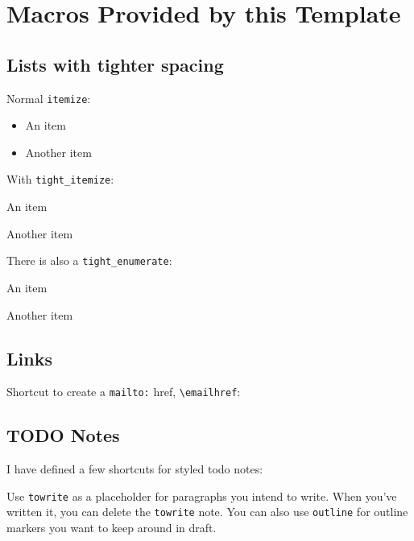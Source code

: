 \section{Macros Provided by this Template}

\subsection{Lists with tighter spacing}

Normal \lstinline{itemize}:

\begin{itemize}
    \item An item
    \item Another item
\end{itemize}

With \lstinline{tight_itemize}:

\begin{tight_itemize}
    \item An item
    \item Another item
\end{tight_itemize}

There is also a \lstinline{tight_enumerate}:

\begin{tight_enumerate}
    \item An item
    \item Another item
\end{tight_enumerate}


\subsection{Links}

Shortcut to create a \lstinline{mailto:} href, \lstinline{\emailhref}:


\subsection{TODO Notes}

I have defined a few shortcuts for styled todo notes:

Use \lstinline{towrite} as a placeholder for paragraphs you intend to write.
When you've written it, you can delete the \lstinline{towrite} note.
You can also use \lstinline{outline} for outline markers you want to keep around in draft.



